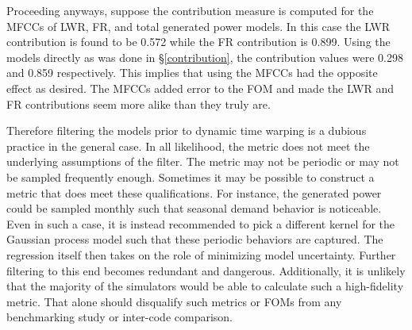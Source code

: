 Proceeding anyways, suppose the contribution measure is computed for the MFCCs 
of LWR, FR, and 
total generated power models.  In this case the LWR contribution is found to be 
0.572 while the FR contribution is 0.899. Using the models directly as was done 
in \S\ref{contribution}, the contribution values were 0.298 and 0.859 respectively.
This implies that using the MFCCs had the opposite effect as desired.  The MFCCs
added error to the FOM and made the LWR and FR contributions seem more alike than 
they truly are.

Therefore filtering the models prior to dynamic time warping is a dubious practice
in the general case. In all likelihood, the metric does not meet the underlying 
assumptions of the filter. The metric may not be periodic or may not be sampled 
frequently enough. Sometimes it may be possible to construct a metric that does
meet these qualifications. For instance, the generated power could be sampled monthly  
such that seasonal demand behavior is noticeable. Even in such a case, it is instead recommended
to pick a different kernel for the Gaussian process model such that these 
periodic behaviors are captured.  The regression itself then takes on the role of 
minimizing model uncertainty. Further filtering to this end becomes redundant and
dangerous.  Additionally, it is unlikely that 
the majority of the simulators would be able to calculate such a high-fidelity metric.
That alone should disqualify such metrics or FOMs from any benchmarking study or
inter-code comparison.
